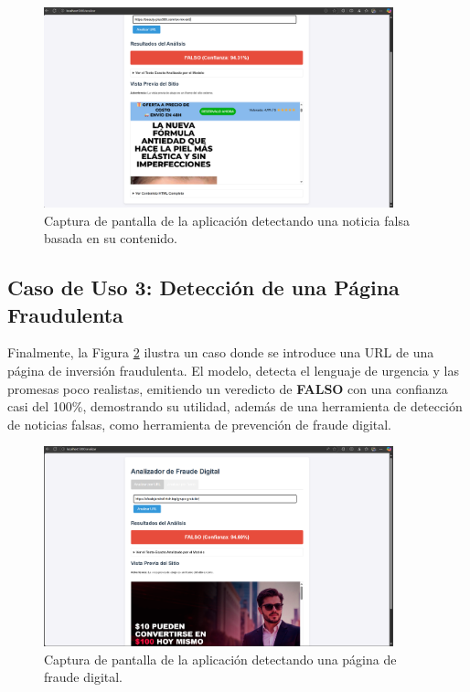 \begin{figure}[htbp]
    \centering
    \includegraphics[width=0.9\textwidth]{Imagenes/app_falsa1.png} %
    \caption{Captura de pantalla de la aplicación detectando una noticia falsa basada en su contenido.}
    \label{fig:app_falsa1}
\end{figure}

\subsection{Caso de Uso 3: Detección de una Página Fraudulenta}
Finalmente, la Figura \ref{fig:app_falsa2} ilustra un caso donde se introduce una URL de una página de inversión fraudulenta. El modelo, detecta el lenguaje de urgencia y las promesas poco realistas, emitiendo un veredicto de \textbf{FALSO} con una confianza casi del 100\%, demostrando su utilidad, además de una herramienta de detección de noticias falsas, como herramienta de prevención de fraude digital.

\begin{figure}[htbp]
    \centering
    \includegraphics[width=0.9\textwidth]{Imagenes/app_falsa2.png} %
    \caption{Captura de pantalla de la aplicación detectando una página de fraude digital.}
    \label{fig:app_falsa2}
\end{figure}
